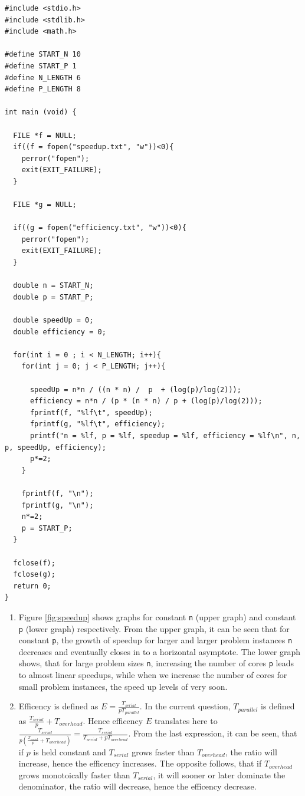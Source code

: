 \documentclass[a4paper,11pt,twoside]{article}
\begin{document}
\begin{verbatim}
#include <stdio.h>
#include <stdlib.h>
#include <math.h>

#define START_N 10
#define START_P 1
#define N_LENGTH 6
#define P_LENGTH 8

int main (void) {
  
  FILE *f = NULL;
  if((f = fopen("speedup.txt", "w"))<0){
    perror("fopen");
    exit(EXIT_FAILURE);
  }

  FILE *g = NULL;

  if((g = fopen("efficiency.txt", "w"))<0){
    perror("fopen");
    exit(EXIT_FAILURE);
  }

  double n = START_N;
  double p = START_P;

  double speedUp = 0;
  double efficiency = 0;

  for(int i = 0 ; i < N_LENGTH; i++){
    for(int j = 0; j < P_LENGTH; j++){

      speedUp = n*n / ((n * n) /  p  + (log(p)/log(2)));
      efficiency = n*n / (p * (n * n) / p + (log(p)/log(2))); 
      fprintf(f, "%lf\t", speedUp);
      fprintf(g, "%lf\t", efficiency);
      printf("n = %lf, p = %lf, speedup = %lf, efficiency = %lf\n", n, p, speedUp, efficiency);
      p*=2;
    }

    fprintf(f, "\n");
    fprintf(g, "\n");
    n*=2;
    p = START_P;
  }

  fclose(f);
  fclose(g);
  return 0;
}
\end{verbatim}

\begin{enumerate}[label={\alph*)}]
\item Figure \ref{fig:speedup} shows graphs for constant \verb+n+ (upper graph) and constant \verb+p+ (lower graph) respectively. From the upper graph, it can be seen that for constant \verb+p+, the growth of speedup for larger and larger problem instances \verb+n+ decreases and eventually closes in to a horizontal asymptote. The lower graph shows, that for large problem sizes \verb+n+, increasing the number of cores \verb+p+ leads to almost linear speedups, while when we increase the number of cores for small problem instances, the speed up levels of very soon.    

\item Efficency is defined as $E = \frac{T_{serial}}{pT_{parallel}}$. In the current question, $T_{parallel}$ is defined as $\frac{T_{serial}}{p}+T_{overhead}$. Hence efficency $E$ translates here to $\frac{T_{serial}}{p(\frac{T_{serial}}{p}+T_{overhead})} = \frac{T_{serial}}{T_{serial}+pT_{overhead}}$. From the last expression, it can be seen, that if $p$ is held constant and $T_{serial}$ grows faster than $T_{overhead}$, the ratio will increase, hence the efficency increases.
The opposite follows, that if $T_{overhead}$ grows monotoically faster than $T_{serial}$, it will sooner or later dominate the denominator, the ratio will decrease, hence the efficency decrease.
  
\end{enumerate}
\end{document}
